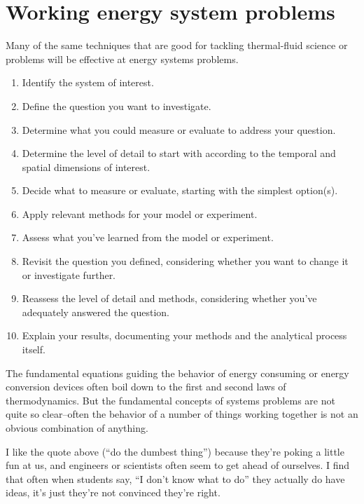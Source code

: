 \documentclass[10pt]{article}
\begin{document}
\section{Working energy system problems}

Many of the same techniques that are good for tackling thermal-fluid science or problems will be effective at energy systems problems.
{\selectfont
\begin{enumerate}
    \item Identify the system of interest.
    \item Define the question you want to investigate.
    \item Determine what you could measure or evaluate to address your question.
    \item Determine the level of detail to start with according to the temporal and spatial dimensions of interest.
    \item Decide what to measure or evaluate, starting with the simplest option(s).
    \item Apply relevant methods for your model or experiment.
    \item Assess what you've learned from the model or experiment.
    \item Revisit the question you defined, considering whether you want to change it or investigate further.
    \item Reassess the level of detail and methods, considering whether you've adequately answered the question.
    \item Explain your results, documenting your methods and the analytical process itself.
\end{enumerate}
}

The fundamental equations guiding the behavior of energy consuming or energy conversion devices often boil down to the first and second laws of thermodynamics. But the fundamental concepts of systems problems are not quite so clear--often the behavior of a number of things working together is not an obvious combination of anything.

I like the quote above (``do the dumbest thing'') because they're poking a little fun at us, and engineers or scientists often seem to get ahead of ourselves. I find that often when students say, ``I don't know what to do'' they actually do have ideas, it's just they're not convinced they're right.
\end{document}
